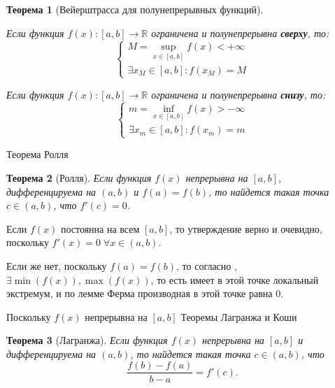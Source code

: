 \documentclass[a4paper,12pt]{extbook}
\newcommand{\newpar}{$ $\par\nobreak\ignorespaces}
\theoremstyle{numbered}
\theoremstyle{named}
\newtheorem*{theorem}{Теорема}
\theoremstyle{named}
\theoremstyle{named}
\renewenvironment{proof}[1][]{\breakenv[Доказательство]{\if\relax\detokenize{#1}\relax\else\;\fi}{#1}}
\newcommand{\plink}[2]{\hyperref[#1]{\color{blue}\underline{#2}}}
\begin{document}
\begin{theorem}[Вейерштрасса для полунепрерывных функций]
    \newpar
    Если функция \(f(x): [a, b] \to \mathbb{R}\) ограничена и полунепрерывна \textbf{сверху}, то:
    \[
        \begin{cases}
            M = \underset{x \in [a, b]}{\sup}f(x) < +\infty \\
            \exists x_M \in [a, b]: f(x_M) = M
        \end{cases}
    \]

    Если функция \(f(x): [a, b] \to \mathbb{R}\) ограничена и полунепрерывна \textbf{снизу}, то:
    \[
        \begin{cases}
            m = \underset{x \in [a, b]}{\inf}f(x) > -\infty \\
            \exists x_m \in [a, b]: f(x_m) = m
        \end{cases}
    \]
\end{theorem}

\begin{proof}
\end{proof}

\section{Теорема Ролля}%
\label{sec:Теорема Ролля}
\begin{theorem}[Ролля]
    Если функция \(f(x)\) непрерывна на \([a, b]\), дифференцируема на \((a, b)\) и \(f(a) = f(b)\), то найдется такая точка \(c \in (a, b)\), что \(f'(c) = 0\).
\end{theorem}

\begin{proof}
    Если \(f(x)\) постоянна на всем \([a, b]\), то утверждение верно и очевидно, поскольку \(f'(x) = 0 \; \forall x \in (a, b)\).

    Если же нет, поскольку \(f(a) = f(b)\), то согласно , \(\exists \min{(f(x)), \max{(f(x))}}\), то есть имеет в этой точке локальный экстремум, и по лемме Ферма производная в этой точке равна 0.

    Поскольку \(f(x)\) непрерывна на \([a, b]\)
\end{proof}

\section{Теоремы Лагранжа и Коши}%
\label{sec:Теоремы Лагранжа и Коши}
\begin{theorem}[Лагранжа]
    Если функция \(f(x)\) непрерывна на \([a, b]\) и дифференцируема на \((a, b)\), то найдется такая точка \(c \in (a, b)\), что
    \[
        \frac{f(b) - f(a)}{b - a} = f'(c).
    \]
\end{theorem}
\end{document}
